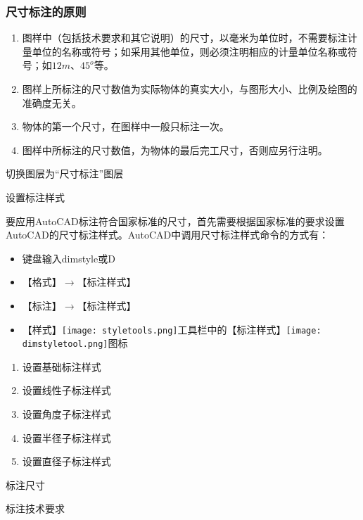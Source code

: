 \subsubsection{尺寸标注的原则}
\begin{enumerate}
\item 图样中（包括技术要求和其它说明）的尺寸，以毫米为单位时，不需要标注计量单位的名称或符号；如采用其他单位，则必须注明相应的计量单位名称或符号；如$12m$、$45^o$等。
\item 图样上所标注的尺寸数值为实际物体的真实大小，与图形大小、比例及绘图的准确度无关。
\item 物体的第一个尺寸，在图样中一般只标注一次。
\item 图样中所标注的尺寸数值，为物体的最后完工尺寸，否则应另行注明。
\end{enumerate}
\begin{procedure}
\item 切换图层为“尺寸标注”图层
\item 设置标注样式

要应用AutoCAD标注符合国家标准的尺寸，首先需要根据国家标准的要求设置AutoCAD的尺寸标注样式。AutoCAD中调用尺寸标注样式命令的方式有：
\begin{itemize}
\item 键盘输入dimstyle或D
\item 【格式】$\rightarrow$【标注样式】
\item 【标注】$\rightarrow$【标注样式】
\item 【样式】\texttt{[image: styletools.png]}工具栏中的【标注样式】\texttt{[image: dimstyletool.png]}图标
\end{itemize}

\begin{enumerate}
\item 设置基础标注样式
\item 设置线性子标注样式
\item 设置角度子标注样式
\item 设置半径子标注样式
\item 设置直径子标注样式
\end{enumerate}
\item 标注尺寸
\item 标注技术要求
\end{procedure}
\endinput